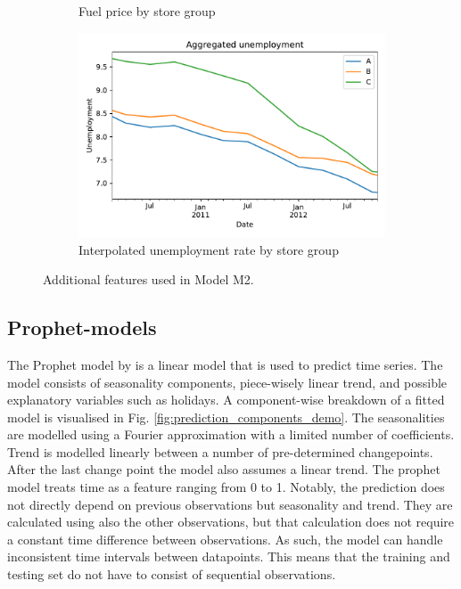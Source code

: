 \documentclass[english, 12pt, a4paper, sci, utf8, a-1b, online]{aaltothesis}
\begin{document}
\begin{figure}[htb]
\begin{subfigure}[b]{0.5\textwidth}
		\caption{Fuel price by store group}
		\label{fig:data_fuel}
	\end{subfigure}
	\hfill
	\begin{subfigure}[b]{0.5\textwidth}
		\centering
		\includegraphics[width=\textwidth]{../plots/dataset/dataset_plot_unemployment_interpolated.pdf}
		\caption{Interpolated unemployment rate by store group}
		\label{fig:data_unemp}
	\end{subfigure}
	\caption{\label{fig:regressors} Additional features used in Model M2.}
\end{figure}


\subsection{Prophet-models}

The Prophet model by \cite{Prophet} is a linear model that is used to predict time series. The model consists of seasonality components, piece-wisely linear trend, and possible explanatory variables such as holidays. A component-wise breakdown of a fitted model is visualised in Fig. \ref{fig:prediction_components_demo}. The seasonalities are modelled using a Fourier approximation with a limited number of coefficients. Trend is modelled linearly between a number of pre-determined changepoints. After the last change point the model also assumes a linear trend. The prophet model treats time as a feature ranging from 0 to 1. Notably, the prediction does not directly depend on previous observations but seasonality and trend. They are calculated using also the other observations, but that calculation does not require a constant time difference between observations. As such, the model can handle inconsistent time intervals between datapoints. This means that the training and testing set do not have to consist of sequential observations.
\end{document}
